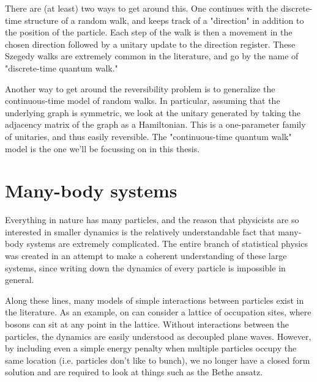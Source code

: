 \documentclass[../thesis-main/thesis-main]{subfiles}
\begin{document}
There are (at least) two ways to get around this.  One continues with the discrete-time structure of a random walk, and keeps track of a "direction" in addition to the position of the particle.  Each step of the walk is then a movement in the chosen direction followed by a unitary update to the direction register.   These Szegedy walks are extremely common in the literature, and go by the name of "discrete-time quantum walk."

Another way to get around the reversibility problem is to generalize the continuous-time model of random walks.  In particular, assuming that the underlying graph is symmetric, we look at the unitary generated by taking the adjacency matrix of the graph as a Hamiltonian.  This is a one-parameter family of unitaries, and thus easily reversible.  The "continuous-time quantum walk" model is the one we'll be focussing on in this thesis.


\section{Many-body systems}

Everything in nature has many particles, and the reason that physicists are so interested in smaller dynamics is the relatively understandable fact that many-body systems are extremely complicated.  The entire branch of statistical physics was created in an attempt to make a coherent understanding of these large systems, since writing down the dynamics of every particle is impossible in general.  

Along these lines, many models of simple interactions between particles exist in the literature.  As an example, on can consider a lattice of occupation sites, where bosons can sit at any point in the lattice.  Without interactions between the particles, the dynamics are easily understood as decoupled plane waves.  However, by including even a simple energy penalty when multiple particles occupy the same location (i.e. particles don't like to bunch), we no longer have a closed form solution and are required to look at things such as the Bethe ansatz.  

\end{document}
